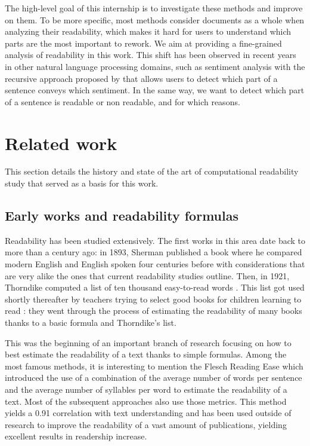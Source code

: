 \documentclass[a4paper, 11pt, onepage]{scrreprt}
\begin{document}
The high-level goal of this internship is to investigate these methods
and improve on them. To be more specific, most methods consider
documents as a whole when analyzing their readability, which makes it
hard for users to understand which parts are the most important to
rework. We aim at providing a fine-grained analysis of readability in
this work. This shift has been observed in recent years in other
natural language processing domains, such as sentiment analysis with
the recursive approach proposed by \cite{socher2013recursive} that
allows users to detect which part of a sentence conveys which
sentiment. In the same way, we want to detect which part of a sentence
is readable or non readable, and for which reasons.

\chapter{Related work}
\label{cha:sota}

This section details the history and state of the art of computational
readability study that served as a basis for this work.

\section{Early works and readability formulas}
\label{sec:early-works-and-formulas}
Readability has been studied extensively. The first works in this area
date back to more than a century ago: in 1893, Sherman published a
book \cite{sherman1893analytics} where he compared modern English and
English spoken four centuries before with considerations that are very
alike the ones that current readability studies outline. Then, in
1921, Thorndike computed a list of ten thousand easy-to-read words
\cite{thorndike1921teacher}. This list got used shortly thereafter by
teachers trying to select good books for children learning to read
\cite{lively1923method}: they went through the process of estimating
the readability of many books thanks to a basic formula and
Thorndike's list.

This was the beginning of an important branch of research focusing on
how to best estimate the readability of a text thanks to simple
formulas. Among the most famous methods, it is interesting to mention
the Flesch Reading Ease \cite{flesch1948new} which introduced the use
of a combination of the average number of words per sentence and the
average number of syllables per word to estimate the readability of a
text. Most of the subsequent approaches also use those metrics. This
method yields a 0.91 correlation with text understanding and has been
used outside of research to improve the readability of a vast amount
of publications, yielding excellent results in readership increase.
\end{document}
